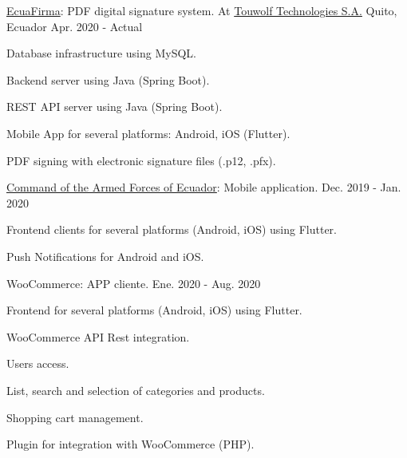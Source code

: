
\begin{cventries}

  \cventry
    {\href{https://ecuafirma.com}{EcuaFirma}: PDF digital signature system.} %
    {At \href{https://touwolf.com/}{Touwolf Technologies S.A.}} %
    {Quito, Ecuador} %
    {Apr. 2020 - Actual} %
    {
      \begin{cvitems} %
        \item {Database infrastructure using MySQL.}
        \item {Backend server using Java (Spring Boot).}
        \item {REST API server using Java (Spring Boot).}
        \item {Mobile App for several platforms: Android, iOS (Flutter).}
        \item {PDF signing with electronic signature files (.p12, .pfx).}
      \end{cvitems}
    }

  \cventry
    {\href{https://www.ccffaa.mil.ec/}{Command of the Armed Forces of Ecuador}: Mobile application.} %
    {} %
    {} %
    {Dec. 2019 - Jan. 2020} %
    {
      \begin{cvitems} %
        \item {Frontend clients for several platforms (Android, iOS) using Flutter.}
        \item {Push Notifications for Android and iOS.}
      \end{cvitems}
    }

  \cventry
    {WooCommerce: APP cliente.} %
    {} %
    {} %
    {Ene. 2020 - Aug. 2020} %
    {
      \begin{cvitems} %
        \item {Frontend for several platforms (Android, iOS) using Flutter.}
        \item {WooCommerce API Rest integration.}
        \item {Users access.}
        \item {List, search and selection of categories and products.}
        \item {Shopping cart management.}
        \item {Plugin for integration with WooCommerce (PHP).}
      \end{cvitems}
    }


\end{cventries}

